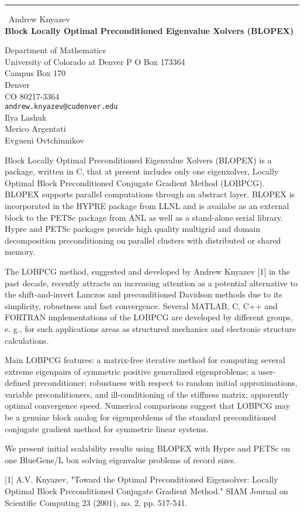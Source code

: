 \documentclass{report}
\begin{document}
\begin{center}
\rule{6in}{1pt} \
{\large Andrew Knyazev \\
{\bf Block Locally Optimal Preconditioned Eigenvalue Xolvers (BLOPEX)}}

Department of Mathematics \\ University of Colorado at Denver P O Box 173364 \\ Campus Box 170 \\ Denver \\ CO 80217-3364
\\
{\tt andrew.knyazev@cudenver.edu}\\
Ilya Lashuk\\
Merico Argentati\\
	Evgueni Ovtchinnikov\end{center}

Block Locally Optimal Preconditioned Eigenvalue Xolvers (BLOPEX) is a
package, written in C, that at present includes only one eigenxolver,
Locally Optimal Block Preconditioned Conjugate Gradient Method (LOBPCG).
BLOPEX supports parallel computations through an abstract layer. BLOPEX
is incorporated in the HYPRE package from LLNL and is availabe as an
external block to the PETSc package from ANL as well as a stand-alone
serial library. Hypre and PETSc packages provide high quality multigrid
and domain decomposition preconditioning on parallel clusters with
distributed or shared memory.

The LOBPCG method, suggested and developed by Andrew Knyazev [1] in the
past decade, recently attracts an increasing attention as a potential
alternative to the shift-and-invert Lanczos and preconditioned Davidson
methods due to its simplicity, robustness and fast convergence. Several
MATLAB, C, C++ and FORTRAN implementations of the LOBPCG are developed by
different groups, e. g., for such applications areas as structured
mechanics and electronic structure calculations.

Main LOBPCG features: a matrix-free iterative method for computing
several extreme eigenpairs of symmetric positive generalized
eigenproblems; a user-defined preconditioner; robustness with respect to
random initial approximations, variable preconditioners, and
ill-conditioning of the stiffness matrix; apparently optimal convergence
speed. Numerical comparisons suggest that LOBPCG may be a genuine block
analog for eigenproblems of the standard preconditioned conjugate
gradient method for symmetric linear systems.

We present initial scalability results using BLOPEX with Hypre and PETSc
on one BlueGene/L box solving eigenvalue problems of record sizes.

[1] A.V. Knyazev, "Toward the Optimal Preconditioned Eigensolver: Locally
Optimal Block Preconditioned Conjugate Gradient Method." SIAM Journal on
Scientific Computing 23 (2001), no. 2, pp. 517-541.
\end{document}
